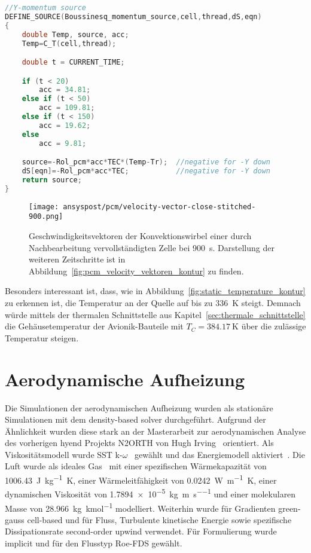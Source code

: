 \begin{lstlisting}[language=C, float, caption={Boussinesq-Approximation des Auftriebs im \ac{pcm} in der \ac{udf} eicosane.c}, label={lst:udf_bossinesque}]
//Y-momentum source
DEFINE_SOURCE(Boussinesq_momentum_source,cell,thread,dS,eqn)
{
	double Temp, source, acc;
	Temp=C_T(cell,thread);

	double t = CURRENT_TIME;

	if (t < 20)
		acc = 34.81;
	else if (t < 50)
		acc = 109.81;
	else if (t < 150)
		acc = 19.62;
	else
		acc = 9.81;

	source=-Rol_pcm*acc*TEC*(Temp-Tr);  //negative for -Y down
	dS[eqn]=-Rol_pcm*acc*TEC; 			//negative for -Y down
	return source;
}
\end{lstlisting}

\begin{figure}[H]
  \centering
  \texttt{[image: ansyspost/pcm/velocity-vector-close-stitched-900.png]}
  \caption{Geschwindigkeitsvektoren der Konvektionswirbel einer durch Nachbearbeitung vervollständigten Zelle
  bei \SI{900}{\second}. Darstellung der weiteren Zeitschritte ist in Abbildung~\ref{fig:pcm_velocity_vektoren_kontur} zu finden.}\label{fig:pcm_vectoren_stitched}
\end{figure}

Besonders interessant ist, dass, wie in Abbildung~\ref{fig:static_temperature_kontur} zu erkennen ist, die Temperatur an der Quelle auf bis zu \SI{336}{\kelvin}
steigt. Demnach würde mittels der thermalen Schnittstelle aus Kapitel~\ref{sec:thermale_schnittstelle} die Gehäusetemperatur der Avionik-Bauteile mit
$T_C = \SI{384,17}{\kelvin}$ über die zulässige Temperatur steigen.

\section{Aerodynamische Aufheizung}\label{sec:sim_aerodynamisch}

Die Simulationen der aerodynamischen Aufheizung wurden als stationäre Simulationen mit dem density-based solver durchgeführt.
Aufgrund der Ähnlichkeit wurden diese stark an der Masterarbeit zur aerodynamischen Analyse des vorherigen
\ac{hyend} Projekts N2ORTH von Hugh Irving~\cite{Irving-2021} orientiert.
Als Viskositätsmodell wurde SST k-$\omega$~\cite{Irving-2021} gewählt und das Energiemodell aktiviert~\cite{Irving-2021}.
Die Luft wurde als ideales Gas~\cite{Irving-2021} mit einer spezifischen Wärmekapazität von \SI{1006,43}{\joule\per\kilogram\kelvin},
einer Wärmeleitfähigkeit von \SI{0,0242}{\watt\per\meter\kelvin}, einer dynamischen Viskosität von \SI{1,7894e-5}{\kilogram\per\meter\per\second}
und einer molekularen Masse von \SI{28,966}{\kilogram\per\kilo\mole} modelliert.
Weiterhin wurde für Gradienten green-gauss cell-based und für Fluss, Turbulente kinetische Energie sowie spezifische Dissipationsrate second-order upwind verwendet.
Für Formulierung wurde implicit und für den Flusstyp Roe-FDS gewählt.

